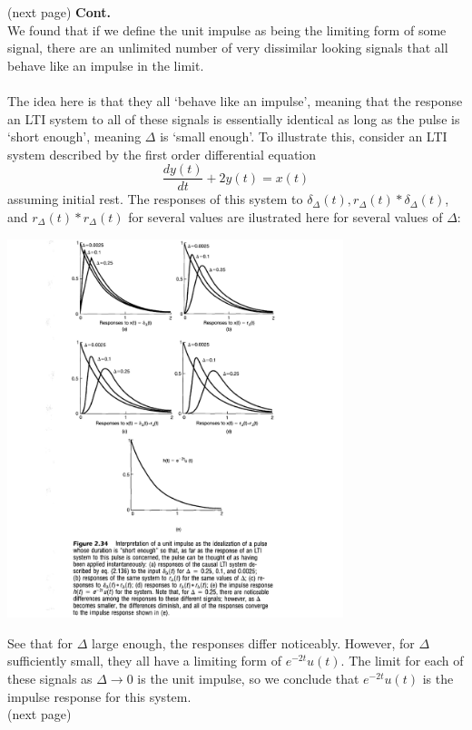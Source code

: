 \documentclass{report}
\begin{document}
(next page)\newpage
\noindent\textbf{Cont.}\\
We found that if we define the unit impulse as being the limiting form of some signal, there are an unlimited number of very dissimilar looking signals that all behave like an impulse in the limit.\\
\vspace{1mm}\\
The idea here is that they all `behave like an impulse', meaning that the response an LTI system to all of these signals is essentially identical as long as the pulse is `short enough', 
meaning $\Delta$ is `small enough'.
To illustrate this, consider an LTI system described by the first order differential equation
\begin{equation*}
\frac{dy(t)}{dt}+2y(t)=x(t)
\end{equation*}
assuming initial rest. The responses of this system to $\delta_\Delta(t),r_\Delta(t)*\delta_\Delta(t)$, and $r_\Delta(t)*r_\Delta(t)$ for several values are ilustrated here for several values of $\Delta$:
\begin{center}
\includegraphics[width=9.8cm]{a55}
\end{center}
See that for $\Delta$ large enough, the responses differ noticeably. However, for $\Delta$ sufficiently small, they all have a limiting form of $e^{-2t}u(t)$. The limit for each of these signals as $\Delta\to0$
is the unit impulse, so we conclude that $e^{-2t}u(t)$ is the impulse response for this system.\\
(next page)\newpage
\end{document}

